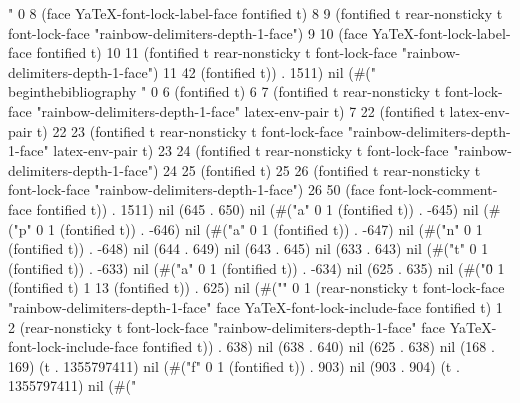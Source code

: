 " 0 8 (face YaTeX-font-lock-label-face fontified t) 8 9 (fontified t rear-nonsticky t font-lock-face "rainbow-delimiters-depth-1-face") 9 10 (face YaTeX-font-lock-label-face fontified t) 10 11 (fontified t rear-nonsticky t font-lock-face "rainbow-delimiters-depth-1-face") 11 42 (fontified t)) . 1511) nil (#("\\begin{thebibliography}{9}%
" 0 6 (fontified t) 6 7 (fontified t rear-nonsticky t font-lock-face "rainbow-delimiters-depth-1-face" latex-env-pair t) 7 22 (fontified t latex-env-pair t) 22 23 (fontified t rear-nonsticky t font-lock-face "rainbow-delimiters-depth-1-face" latex-env-pair t) 23 24 (fontified t rear-nonsticky t font-lock-face "rainbow-delimiters-depth-1-face") 24 25 (fontified t) 25 26 (fontified t rear-nonsticky t font-lock-face "rainbow-delimiters-depth-1-face") 26 50 (face font-lock-comment-face fontified t)) . 1511) nil (645 . 650) nil (#("a" 0 1 (fontified t)) . -645) nil (#("p" 0 1 (fontified t)) . -646) nil (#("a" 0 1 (fontified t)) . -647) nil (#("n" 0 1 (fontified t)) . -648) nil (644 . 649) nil (643 . 645) nil (633 . 643) nil (#("t" 0 1 (fontified t)) . -633) nil (#("a" 0 1 (fontified t)) . -634) nil (625 . 635) nil (#("\" 0 1 (fontified t) 1 13 (fontified t)) . 625) nil (#("{}" 0 1 (rear-nonsticky t font-lock-face "rainbow-delimiters-depth-1-face" face YaTeX-font-lock-include-face fontified t) 1 2 (rear-nonsticky t font-lock-face "rainbow-delimiters-depth-1-face" face YaTeX-font-lock-include-face fontified t)) . 638) nil (638 . 640) nil (625 . 638) nil (168 . 169) (t . 1355797411) nil (#("f" 0 1 (fontified t)) . 903) nil (903 . 904) (t . 1355797411) nil (#("

